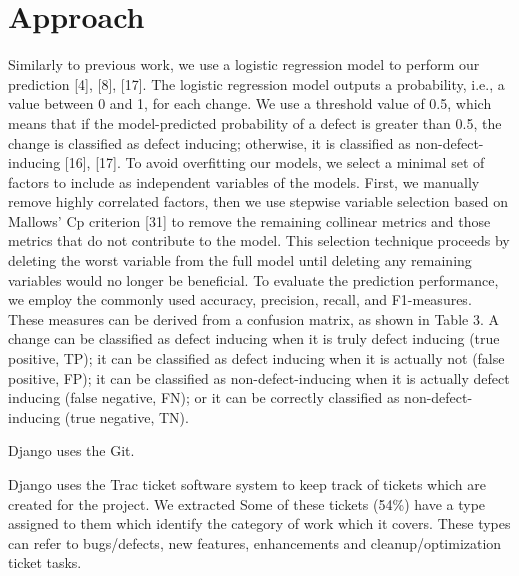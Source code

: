 \documentclass[10pt, conference]{IEEEtran}
\begin{document}
\section{Approach}
\label{sec:approach}
Similarly to previous work, we use a logistic regression model to perform our prediction [4], [8], [17]. The logistic regression model outputs a probability, i.e., a value between 0 and 1, for each change. We use a threshold value of 0.5, which means that if the model-predicted probability of a defect is greater than 0.5, the change is classified as defect inducing; otherwise, it is classified as non-defect-inducing [16], [17]. To avoid overfitting our models, we select a minimal set of factors to include as independent variables of the models. First, we manually remove highly correlated factors, then we use stepwise variable selection based on Mallows’ Cp criterion [31] to remove the remaining collinear metrics and those metrics that do not contribute to the model. This selection technique proceeds by deleting the worst variable from the full model until deleting any remaining variables would no longer be beneficial. To evaluate the prediction performance, we employ the commonly used accuracy, precision, recall, and F1-measures. These measures can be derived from a confusion matrix, as shown in Table 3. A change can be classified as defect inducing when it is truly defect inducing (true positive, TP); it can be classified as defect inducing when it is actually not (false positive, FP); it can be classified as non-defect-inducing when it is actually defect inducing (false negative, FN); or it can be correctly classified as non-defect-inducing (true negative, TN). 

Django uses the Git.   

Django uses the Trac ticket software system to keep track of tickets which are created for the project. We extracted Some of these tickets (54\%) have a type assigned to them which identify the category of work which it covers. These types can refer to bugs/defects, new features, enhancements and cleanup/optimization ticket tasks. 
\end{document}
